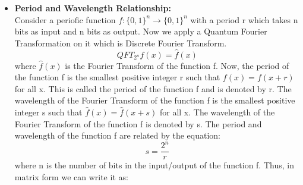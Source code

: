\documentclass[12pt, oneside]{book}
\theoremstyle{definition}
\theoremstyle{definition}
\newtheorem{example}{Example}[section]
\theoremstyle{remark}
\begin{document}
\begin{itemize}
\begin{example}
        In order to gather information about the phases, consider the following example.
        Consider the states $\ket{\Theta}=\frac{1}{2}\begin{pmatrix} 1 \\ 1 \\ 1 \\ 1 \end{pmatrix}$ and $\ket{\Phi}=\frac{1}{2}\begin{pmatrix} 1 \\ \iota \\ -1 \\ -\iota \end{pmatrix}$. 
        We can't tell the difference by measuring the states.
        Upon applying $QFT_4$. We get:
        \[ QFT_4\ket{\Theta}=\begin{pmatrix} 1 \\ 0 \\ 0 \\ 0 \end{pmatrix} \]
        \[ QFT_4\ket{\Phi}=\begin{pmatrix} 0 \\ 1 \\ 0 \\ 0 \end{pmatrix} \]
        Thus, measuring the Fourier Transform of the states will reveal the relative phases.
    \end{example}
    \item \textbf{Period and Wavelength Relationship: }\\
    Consider a periofic function $f:\{0,1\}^n \rightarrow \{0,1\}^n$ with a period r which takes n bits as input and n bits as output. Now we apply a Quantum Fourier Transformation on it
    which is Discrete Fourier Transform.
    \[ 
    QFT_{2^n} f(x) = \hat{f}(x)
    \]
    where $\hat{f}(x)$ is the Fourier Transform of the function f. 
    Now, the period of the function f is the smallest positive integer r 
    such that $f(x)=f(x+r)$ for all x. This is called the period of the function f and is denoted by r. 
    The wavelength of the Fourier Transform of the 
    function f is the smallest positive integer s such that $\hat{f}(x)=\hat{f}(x+s)$ 
    for all x. The wavelength of the Fourier Transform of the function f is denoted by 
    s. The period and wavelength of the function f are related by the equation:
    \[ s=\dfrac{2^n}{r} \]
    where n is the number of bits in the input/output of the function f. 
    Thus, in matrix form we can write it as:

\end{itemize}
\end{document}
